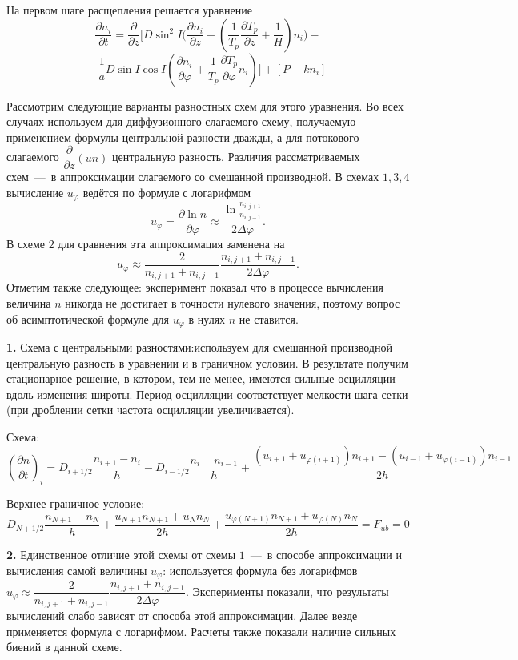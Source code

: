\documentclass[2pt, a4paper, fleqn]{extarticle}
\begin{document}
На первом шаге расщепления решается уравнение $$\dfrac{\partial n_i}{\partial t} = \dfrac{\partial}{\partial z}\bigg[D\sin^2 I \bigg(\dfrac{\partial n_i}{\partial z}+\left(\dfrac{1}{T_p}\dfrac{\partial T_p}{\partial z}+\dfrac{1}{H}\right)n_i\bigg)-$$ $$-\dfrac{1}{a}D\sin I\cos I\left(\dfrac{\partial n_i}{\partial\varphi}+\dfrac{1}{T_p}\dfrac{\partial T_p}{\partial \varphi}n_i\right)\bigg]+[P-kn_i]$$

Рассмотрим следующие варианты разностных схем для этого уравнения. Во всех случаях используем для диффузионного слагаемого схему, получаемую применением формулы центральной разности дважды, а для потокового слагаемого $\dfrac{\partial}{\partial z} (un)$ центральную разность. Различия рассматриваемых схем~---~в аппроксимации слагаемого со смешанной производной. В схемах $1, 3, 4$ вычисление $u_\varphi$ ведётся по формуле с логарифмом $$u_\varphi = \dfrac{\partial \ln n}{\partial\varphi}\approx \dfrac{\ln\frac{n_{i, j+1}}{n_{i, j-1}}}{2\Delta\varphi}.$$ В схеме $2$ для сравнения эта аппроксимация заменена на $$u_\varphi \approx \dfrac{2}{n_{i, j+1}+n_{i, j-1}}\dfrac{n_{i, j+1}+n_{i, j-1}}{2\Delta\varphi}.$$ Отметим также следующее: эксперимент показал что в процессе вычисления величина $n$ никогда не достигает в точности нулевого значения, поэтому вопрос об асимптотической формуле для $u_\varphi$ в нулях $n$ не ставится.

\medskip

{\bf 1.} Схема с центральными разностями:используем для смешанной производной центральную разность в уравнении и в граничном условии. В результате получим стационарное решение, в котором, тем не менее, имеются сильные осцилляции вдоль изменения широты. Период осцилляции соответствует мелкости шага сетки (при дроблении сетки частота осцилляции увеличивается).

Схема: $$\left(\dfrac{\partial n}{\partial t}\right)_i = D_{i+1/2}\dfrac{n_{i+1}-n_i}{h} - D_{i-1/2}\dfrac{n_{i}-n_{i-1}}{h}+\dfrac{(u_{i+1}+u_{\varphi(i+1)})n_{i+1}-(u_{i-1}+u_{\varphi(i-1)})n_{i-1}}{2h}$$

Верхнее граничное условие: $$D_{N+1/2}\dfrac{n_{N+1}-n_{N}}{h}+\dfrac{u_{N+1}n_{N+1}+u_{N}n_{N}}{2h}+\dfrac{u_{\varphi(N+1)}n_{N+1}+u_{\varphi(N)}n_{N}}{2h} = F_{ub} = 0$$

\medskip

{\bf 2.} Единственное отличие этой схемы от схемы $1$~---~в способе аппроксимации и вычисления самой величины $u_\varphi$: используется формула без логарифмов $u_\varphi \approx \dfrac{2}{n_{i, j+1}+n_{i, j-1}}\dfrac{n_{i, j+1}+n_{i, j-1}}{2\Delta\varphi}$. Эксперименты показали, что результаты вычислений слабо зависят от способа этой аппроксимации. Далее везде применяется формула с логарифмом. Расчеты также показали наличие сильных биений в данной схеме.
\end{document}
